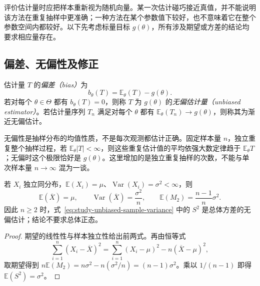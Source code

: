 评价估计量时应把样本重新视为随机向量。某一次估计碰巧接近真值，并不能说明该方法在重复抽样中更准确；一种方法在某个参数值下较好，也不意味着它在整个参数空间内都较好。以下先考虑标量目标 $g(\theta)$，所有涉及期望或方差的结论均要求相应量存在。

\subsection{偏差、无偏性及修正}

\begin{definition}[偏差与无偏性]
\label{def:study-estimator-bias}
估计量 $T$ 的\emph{偏差（bias）}为
\begin{equation}
  b_\theta(T)=\mathbb E_\theta(T)-g(\theta).
  \label{eq:study-estimator-bias}
\end{equation}
若对每个 $\theta\in\Theta$ 都有 $b_\theta(T)=0$，则称 $T$ 为 $g(\theta)$ 的\emph{无偏估计量（unbiased estimator）}。若估计量序列 $T_n$ 满足对每个 $\theta$ 都有 $\mathbb E_\theta(T_n)\to g(\theta)$，则称其为渐近无偏估计。
\end{definition}

无偏性是抽样分布的均值性质，不是每次观测都估计正确。固定样本量 $n$，独立重复整个抽样过程，若 $\mathbb E_\theta|T|<\infty$，则这些重复估计值的平均依强大数定律趋于 $\mathbb E_\theta T$；无偏时这个极限恰好是 $g(\theta)$。这里增加的是独立重复抽样的次数，不能与单次样本量 $n\to\infty$ 混为一谈。

\begin{proposition}[均值和方差的无偏估计]
\label{prop:study-unbiased-mean-variance}
若 $X_i$ 独立同分布，$\mathbb E(X_i)=\mu$、$\operatorname{Var}(X_i)=\sigma^2<\infty$，则
\begin{equation}
  \mathbb E(\overline X)=\mu,\qquad
  \operatorname{Var}(\overline X)=\frac{\sigma^2}{n},\qquad
  \mathbb E(M_2)=\frac{n-1}{n}\sigma^2.
  \label{eq:study-mean-variance-expectations}
\end{equation}
因此 $n\ge2$ 时，式~\eqref{eq:study-unbiased-sample-variance} 中的 $S^2$ 是总体方差的无偏估计；结论不要求总体正态。
\end{proposition}

\begin{proof}
期望的线性性与样本独立性给出前两式。再由恒等式
\[
  \sum_{i=1}^n(X_i-\overline X)^2
    =\sum_{i=1}^n(X_i-\mu)^2-n(\overline X-\mu)^2,
\]
取期望得到 $n\mathbb E(M_2)=n\sigma^2-n(\sigma^2/n)=(n-1)\sigma^2$。乘以 $1/(n-1)$ 即得 $\mathbb E(S^2)=\sigma^2$。
\end{proof}

